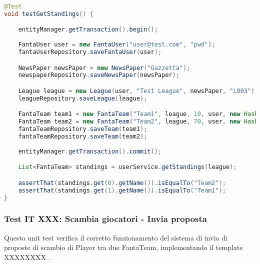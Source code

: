 \begin{lstlisting}[language=Java]
@Test
void testGetStandings() {

	entityManager.getTransaction().begin();
		
	FantaUser user = new FantaUser("user@test.com", "pwd");
	fantaUserRepository.saveFantaUser(user);

	NewsPaper newsPaper = new NewsPaper("Gazzetta");
	newspaperRepository.saveNewsPaper(newsPaper);

	League league = new League(user, "Test League", newsPaper, "L003");
	leagueRepository.saveLeague(league);

	FantaTeam team1 = new FantaTeam("Team1", league, 10, user, new HashSet<>());
	FantaTeam team2 = new FantaTeam("Team2", league, 70, user, new HashSet<>());
	fantaTeamRepository.saveTeam(team1);
	fantaTeamRepository.saveTeam(team2);
		
	entityManager.getTransaction().commit();

	List<FantaTeam> standings = userService.getStandings(league);

	assertThat(standings.get(0).getName()).isEqualTo("Team2");
	assertThat(standings.get(1).getName()).isEqualTo("Team1");
}
\end{lstlisting}


\subsubsection{Test IT XXX: Scambia giocatori - Invia proposta}

Questo unit test verifica il corretto funzionamento del sistema di invio di proposte di scambio di Player tra due FantaTeam,
implementando il template XXXXXXXX .

